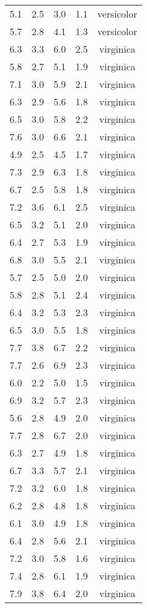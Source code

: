 \documentclass[
  letterpaper,
  DIV=11,
  numbers=noendperiod]{scrartcl}
\begin{document}
\begin{longtable}[]{@{}lrlrc@{}}
5.1 & 2.5 & 3.0 & 1.1 & versicolor \\
5.7 & 2.8 & 4.1 & 1.3 & versicolor \\
6.3 & 3.3 & 6.0 & 2.5 & virginica \\
5.8 & 2.7 & 5.1 & 1.9 & virginica \\
7.1 & 3.0 & 5.9 & 2.1 & virginica \\
6.3 & 2.9 & 5.6 & 1.8 & virginica \\
6.5 & 3.0 & 5.8 & 2.2 & virginica \\
7.6 & 3.0 & 6.6 & 2.1 & virginica \\
4.9 & 2.5 & 4.5 & 1.7 & virginica \\
7.3 & 2.9 & 6.3 & 1.8 & virginica \\
6.7 & 2.5 & 5.8 & 1.8 & virginica \\
7.2 & 3.6 & 6.1 & 2.5 & virginica \\
6.5 & 3.2 & 5.1 & 2.0 & virginica \\
6.4 & 2.7 & 5.3 & 1.9 & virginica \\
6.8 & 3.0 & 5.5 & 2.1 & virginica \\
5.7 & 2.5 & 5.0 & 2.0 & virginica \\
5.8 & 2.8 & 5.1 & 2.4 & virginica \\
6.4 & 3.2 & 5.3 & 2.3 & virginica \\
6.5 & 3.0 & 5.5 & 1.8 & virginica \\
7.7 & 3.8 & 6.7 & 2.2 & virginica \\
7.7 & 2.6 & 6.9 & 2.3 & virginica \\
6.0 & 2.2 & 5.0 & 1.5 & virginica \\
6.9 & 3.2 & 5.7 & 2.3 & virginica \\
5.6 & 2.8 & 4.9 & 2.0 & virginica \\
7.7 & 2.8 & 6.7 & 2.0 & virginica \\
6.3 & 2.7 & 4.9 & 1.8 & virginica \\
6.7 & 3.3 & 5.7 & 2.1 & virginica \\
7.2 & 3.2 & 6.0 & 1.8 & virginica \\
6.2 & 2.8 & 4.8 & 1.8 & virginica \\
6.1 & 3.0 & 4.9 & 1.8 & virginica \\
6.4 & 2.8 & 5.6 & 2.1 & virginica \\
7.2 & 3.0 & 5.8 & 1.6 & virginica \\
7.4 & 2.8 & 6.1 & 1.9 & virginica \\
7.9 & 3.8 & 6.4 & 2.0 & virginica \\

\end{longtable}
\end{document}

